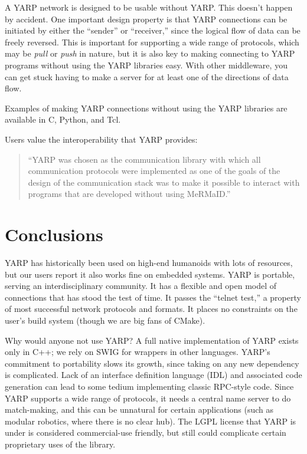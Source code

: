 \documentclass[letterpaper]{article}
\begin{document}
A YARP network is designed to be usable without YARP.  This doesn't
happen by accident.  
One important design property is that YARP
connections can be initiated by either the ``sender'' or ``receiver,''
since the logical flow of data can be freely reversed.  This is
important for supporting a wide range of protocols, which may be {\it
  pull} or {\it push} in nature, but it is also key to making
connecting to YARP programs without using the YARP libraries easy.
With other middleware, you can get stuck having to make a server for
at least one of the directions of data flow.

Examples of making YARP connections without using the YARP libraries are
available in C, Python, and Tcl.

\noindent Users value the interoperability that YARP provides:

\begin{quote}
``YARP was chosen as the communication library with
which all communication protocols were implemented as
one of the goals of the design of the communication stack
was to make it possible to interact with programs that are
developed without using MeRMaID.'' \cite{barbosa09mermaid}
\end{quote}

\section{Conclusions}

YARP has historically been used on high-end humanoids with lots of
resources, but our users report it also works fine on embedded
systems.  YARP is portable, serving an interdisciplinary community.
It has a flexible and open model of connections that has stood the
test of time.  It passes the ``telnet test,'' a property of most 
successful network protocols and formats.  It places no constraints
on the user's build system (though we are big fans of CMake).

Why would anyone not use YARP?  A full native implementation of YARP
exists only in C++; we rely on SWIG for wrappers in other languages.
YARP's commitment to portability slows its growth, since taking on any
new dependency is complicated.  Lack of an interface definition
language (IDL) and associated code generation can lead to some tedium
implementing classic RPC-style code. Since YARP supports a wide range
of protocols, it needs a central name server to do match-making, and
this can be unnatural for certain applications (such as modular
robotics, where there is no clear hub). The LGPL license that YARP is
under is considered commercial-use friendly, but still could
complicate certain proprietary uses of the library.
\end{document}
